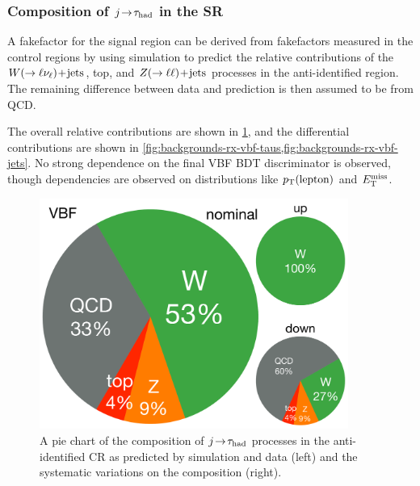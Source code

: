 \subsubsection{Composition of $j\!\rightarrow\!\tau_\text{had}$ in the SR}

A fakefactor for the signal region can be derived from fakefactors measured in the control regions by using simulation to predict the relative contributions of the $W (\rightarrow \ell\nu_\ell)\!+\!\text{jets}$, top, and $Z (\rightarrow \ell\ell)\!+\!\text{jets}$ processes in the anti-identified region. The remaining difference between data and prediction is then assumed to be from QCD.

The overall relative contributions are shown in \cref{fig:backgrounds-rx-vbf}, and the differential contributions are shown in \cref{fig:backgrounds-rx-vbf-taus,fig:backgrounds-rx-vbf-jets}. No strong dependence on the final VBF BDT discriminator is observed, though dependencies are observed on distributions like $p_{\mathrm{T}}(\text{lepton})$ and $E_{\mathrm{T}}^{\mathrm{miss}}$.

\begin{figure}[tp]
  \centering
  \includegraphics[width=0.90\textwidth]{figures/backgrounds/rx-vbf}
  \caption{A pie chart of the composition of $j\!\rightarrow\!\tau_\text{had}$ processes in the anti-identified CR as predicted by simulation and data (left) and the systematic variations on the composition (right).}
  \label{fig:backgrounds-rx-vbf}
\end{figure}

\clearpage

